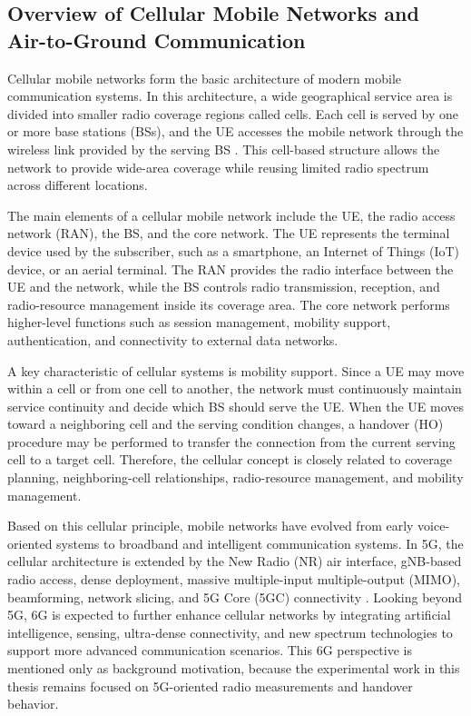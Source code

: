 ﻿\subsection{Overview of Cellular Mobile Networks and Air-to-Ground Communication}

Cellular mobile networks form the basic architecture of modern mobile communication systems. In this architecture, a wide geographical service area is divided into smaller radio coverage regions called cells. Each cell is served by one or more base stations (BSs), and the UE accesses the mobile network through the wireless link provided by the serving BS \cite{itu_m2083}. This cell-based structure allows the network to provide wide-area coverage while reusing limited radio spectrum across different locations.

The main elements of a cellular mobile network include the UE, the radio access network (RAN), the BS, and the core network. The UE represents the terminal device used by the subscriber, such as a smartphone, an Internet of Things (IoT) device, or an aerial terminal. The RAN provides the radio interface between the UE and the network, while the BS controls radio transmission, reception, and radio-resource management inside its coverage area. The core network performs higher-level functions such as session management, mobility support, authentication, and connectivity to external data networks.

A key characteristic of cellular systems is mobility support. Since a UE may move within a cell or from one cell to another, the network must continuously maintain service continuity and decide which BS should serve the UE. When the UE moves toward a neighboring cell and the serving condition changes, a handover (HO) procedure may be performed to transfer the connection from the current serving cell to a target cell. Therefore, the cellular concept is closely related to coverage planning, neighboring-cell relationships, radio-resource management, and mobility management.

Based on this cellular principle, mobile networks have evolved from early voice-oriented systems to broadband and intelligent communication systems. In 5G, the cellular architecture is extended by the New Radio (NR) air interface, gNB-based radio access, dense deployment, massive multiple-input multiple-output (MIMO), beamforming, network slicing, and 5G Core (5GC) connectivity \cite{3gpp_38300}. Looking beyond 5G, 6G is expected to further enhance cellular networks by integrating artificial intelligence, sensing, ultra-dense connectivity, and new spectrum technologies to support more advanced communication scenarios. This 6G perspective is mentioned only as background motivation, because the experimental work in this thesis remains focused on 5G-oriented radio measurements and handover behavior.

